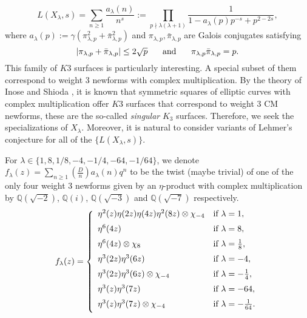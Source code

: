 \documentclass[12pt]{amsart}
\newcommand{\Q}{\mathbb{Q}}
\newcommand{\pil}{\pi_{\lambda,p}}
\newcommand{\pilb}{\bar{\pi}_{\lambda,p}}
\numberwithin{equation}{section}
\begin{document}
 \begin{equation}\label{link}
     L(X_\lambda ,s)=\sum_{ n\ge 1}\frac{a_{\lambda}(n)}{n^s}:=\prod_{p\nmid \lambda(\lambda+1)} \frac{1}{1-a_{\lambda}(p)p^{-s}+ p^{2-2s}},
 \end{equation}
  where $a_{\lambda}(p):= \gamma(\pil^2+\pilb^2)$ and $\pil,\pilb$ are Galois conjugates satisfying $$|\pil+\pilb|\le 2\sqrt{p}\hspace{5mm}\text{ and }\hspace{5mm}\pil\pilb=p.$$ 
  This family of $K3$ surfaces is particularly interesting. A special subset of them correspond to weight $3$ newforms with complex multiplication. By the theory of Inose and Shioda \cite{IS, Shioda}, it is known that symmetric squares of elliptic curves with complex multiplication offer $K3$ surfaces that correspond to weight $3$ CM newforms, these are the so-called \textit{singular} $K_3$ surfaces. Therefore, we seek the specializations of $X_{\lambda}$. Moreover, it is natural to consider variants of Lehmer's conjecture for all of the $\{L(X_\lambda,s)\}$.
  
  For $\lambda\in \{1, 8,1/8, -4, -1/4,-64,-1/64\}$, we denote $f_\lambda(z)=\sum_{n\ge 1}\left(\frac{D}{n}\right)a_{\lambda}(n)q^n$ to be the twist (maybe trivial) of one of the only four weight $3$ newforms given by an $\eta$-product \cite{Martin} with complex multiplication by $\Q(\sqrt{-2})$, $\Q(i)$, $\Q(\sqrt{-3})$ and $\Q(\sqrt{-7})$ respectively.
\vspace{2mm}
\begin{equation}{\label{eta}}
f_\lambda(z)=\left\{
	\begin{array}{ll}
	\vspace{2mm}
		  	\eta^2(z)\eta(2z)\eta(4z)\eta^2(8z)\otimes \chi_{-4}	& \mbox{if } \lambda=1,\\
		  	\vspace{2mm}
		  	\eta^6(4z)   & \mbox{if } \lambda=8, \\
		  \vspace{2mm}
		    \eta^6(4z)\otimes \chi_8   & \mbox{if } \lambda= \frac18, \\
		  \vspace{2mm}
		 	\eta^3(2z)\eta^3(6z)& \mbox{if } \lambda=-4,\\
	\vspace{2mm}
		 \eta^3(2z)\eta^3(6z)\otimes \chi_{-4}   & \mbox{if } \lambda=-\frac14, \\
			\vspace{2mm}
			\eta^3(z)\eta^3(7z) & \mbox{if } \lambda=-64,\\
			\vspace{2mm}
		\eta^3(z)\eta^3(7z)\otimes \chi_{-4}& \mbox{if } \lambda=-\frac{1}{64}.
	\end{array}
\right.
\end{equation}
\end{document}
